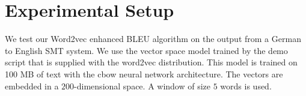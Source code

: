 
\section{Experimental Setup}
\label{sec:experiments}

We test our Word2vec enhanced BLEU algorithm on the output from a German to English SMT system. 
We use the vector space model trained by the demo script that is supplied with the word2vec distribution. 
This model is trained on 100 MB of text with the cbow neural network architecture. 
The vectors are embedded in a $200$-dimensional space. 
A window of size $5$ words is used. 

